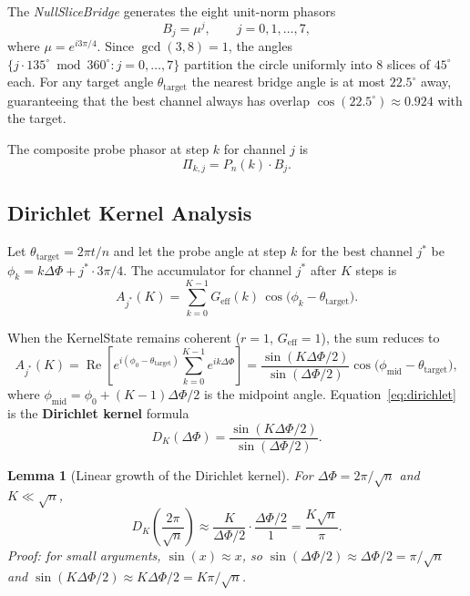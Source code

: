 \documentclass[12pt,a4paper]{article}
\theoremstyle{plain}
\newtheorem{lemma}[theorem]{Lemma}
\theoremstyle{definition}
\theoremstyle{remark}
\begin{document}
The \emph{NullSliceBridge} generates the eight unit-norm phasors
\begin{equation}
  B_j = \mu^j, \qquad j = 0,1,\ldots,7,
  \label{eq:bridge}
\end{equation}
where $\mu=e^{i3\pi/4}$.  Since $\gcd(3,8)=1$, the angles
$\{j\cdot 135^\circ \bmod 360^\circ : j=0,\ldots,7\}$ partition the circle
uniformly into $8$ slices of $45^\circ$ each.  For any target angle
$\theta_{\text{target}}$ the nearest bridge angle is at most $22.5^\circ$
away, guaranteeing that the best channel always has overlap
$\cos(22.5^\circ) \approx 0.924$ with the target.

The composite probe phasor at step $k$ for channel $j$ is
\begin{equation}
  \Pi_{k,j} = P_n(k)\cdot B_j.
  \label{eq:probe}
\end{equation}

\subsection{Dirichlet Kernel Analysis}
\label{sec:dirichlet}

Let $\theta_{\text{target}}=2\pi t/n$ and let the probe angle at step $k$
for the best channel $j^*$ be $\phi_{k} = k\Delta\Phi + j^*\cdot 3\pi/4$.
The accumulator for channel $j^*$ after $K$ steps is
\begin{equation}
  A_{j^*}(K)
  = \sum_{k=0}^{K-1} G_{\text{eff}}(k)\,
    \cos\!\bigl(\phi_k - \theta_{\text{target}}\bigr).
  \label{eq:accumulator}
\end{equation}

When the KernelState remains coherent ($r=1$, $G_{\text{eff}}=1$), the sum
reduces to
\begin{equation}
  A_{j^*}(K)
  = \operatorname{Re}\!\left[
      e^{i(\phi_0 - \theta_{\text{target}})}
      \sum_{k=0}^{K-1} e^{ik\Delta\Phi}
    \right]
  = \frac{\sin(K\Delta\Phi/2)}{\sin(\Delta\Phi/2)}
    \cos\!\bigl(\phi_{\text{mid}} - \theta_{\text{target}}\bigr),
  \label{eq:dirichlet}
\end{equation}
where $\phi_{\text{mid}} = \phi_0 + (K-1)\Delta\Phi/2$ is the midpoint angle.
Equation~\eqref{eq:dirichlet} is the \textbf{Dirichlet kernel} formula
\begin{equation}
  D_K(\Delta\Phi) = \frac{\sin(K\Delta\Phi/2)}{\sin(\Delta\Phi/2)}.
  \label{eq:dk-formula}
\end{equation}

\begin{lemma}[Linear growth of the Dirichlet kernel]
  \label{lem:dk-growth}
  For $\Delta\Phi = 2\pi/\sqrt{n}$ and $K \ll \sqrt{n}$,
  \begin{equation}
    D_K\!\left(\frac{2\pi}{\sqrt{n}}\right)
    \approx \frac{K}{\Delta\Phi/2} \cdot \frac{\Delta\Phi/2}{1}
    = \frac{K\sqrt{n}}{\pi}.
    \label{eq:dk-approx}
  \end{equation}
  Proof: for small arguments, $\sin(x) \approx x$, so
  $\sin(\Delta\Phi/2) \approx \Delta\Phi/2 = \pi/\sqrt{n}$ and
  $\sin(K\Delta\Phi/2) \approx K\Delta\Phi/2 = K\pi/\sqrt{n}$.
\end{lemma}
\end{document}
